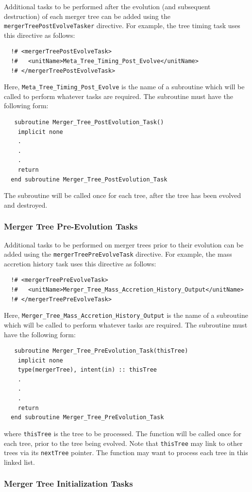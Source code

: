 Additional tasks to be performed after the evolution (and subsequent destruction) of each merger tree can be added using the {\tt mergerTreePostEvolveTasker} directive. For example, the tree timing task uses this directive as follows:
\begin{verbatim}
  !# <mergerTreePostEvolveTask>
  !#   <unitName>Meta_Tree_Timing_Post_Evolve</unitName>
  !# </mergerTreePostEvolveTask>
\end{verbatim}
Here, {\tt Meta\_Tree\_Timing\_Post\_Evolve} is the name of a subroutine which will be called to perform whatever tasks are required. The subroutine must have the following form:
\begin{verbatim}
   subroutine Merger_Tree_PostEvolution_Task()
    implicit none
    .
    .
    .
    return
  end subroutine Merger_Tree_PostEvolution_Task
\end{verbatim}
The subroutine will be called once for each tree, after the tree has been evolved and destroyed.

\subsubsection{Merger Tree Pre-Evolution Tasks}\label{sec:MergerTreePreEvolveTask}

Additional tasks to be performed on merger trees prior to their evolution can be added using the {\tt mergerTreePreEvolveTask} directive. For example, the mass accretion history task uses this directive as follows:
\begin{verbatim}
  !# <mergerTreePreEvolveTask>
  !#   <unitName>Merger_Tree_Mass_Accretion_History_Output</unitName>
  !# </mergerTreePreEvolveTask>
\end{verbatim}
Here, {\tt Merger\_Tree\_Mass\_Accretion\_History\_Output} is the name of a subroutine which will be called to perform whatever tasks are required. The subroutine must have the following form:
\begin{verbatim}
   subroutine Merger_Tree_PreEvolution_Task(thisTree)
    implicit none
    type(mergerTree), intent(in) :: thisTree
    .
    .
    .
    return
  end subroutine Merger_Tree_PreEvolution_Task
\end{verbatim}
where {\tt thisTree} is the tree to be processed. The function will be called once for each tree, prior to the tree being evolved. Note that {\tt thisTree} may link to other trees via its {\tt nextTree} pointer. The function may want to process each tree in this linked list.

\subsubsection{Merger Tree Initialization Tasks}

